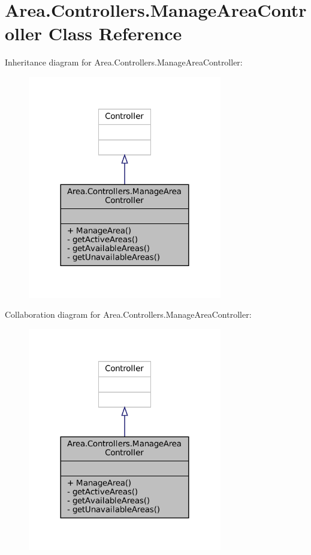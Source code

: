 \hypertarget{classArea_1_1Controllers_1_1ManageAreaController}{}\section{Area.\+Controllers.\+Manage\+Area\+Controller Class Reference}
\label{classArea_1_1Controllers_1_1ManageAreaController}


Inheritance diagram for Area.\+Controllers.\+Manage\+Area\+Controller\+:
\nopagebreak
\begin{figure}[H]
\begin{center}
\leavevmode
\includegraphics[width=240pt]{classArea_1_1Controllers_1_1ManageAreaController__inherit__graph}
\end{center}
\end{figure}


Collaboration diagram for Area.\+Controllers.\+Manage\+Area\+Controller\+:
\nopagebreak
\begin{figure}[H]
\begin{center}
\leavevmode
\includegraphics[width=240pt]{classArea_1_1Controllers_1_1ManageAreaController__coll__graph}
\end{center}
\end{figure}
